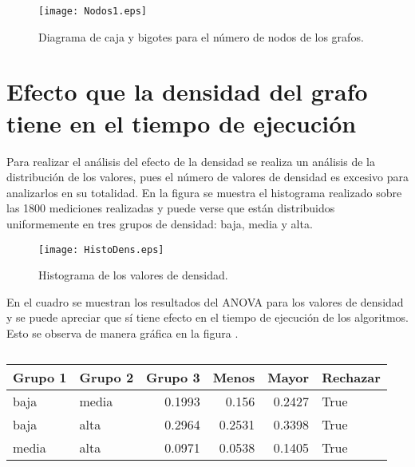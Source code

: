 \documentclass{article}
\begin{document}
\begin{figure}
\begin{center}
  \texttt{[image: Nodos1.eps]}
\end{center}
\vspace*{-8mm}
\caption{Diagrama de caja y bigotes para el número de nodos de los grafos.}
  \label{Figura 4} 
\end{figure}

\section*{Efecto que la densidad del grafo tiene en el tiempo de ejecución}

Para realizar el análisis del efecto de la densidad se realiza un análisis de la distribución de los valores, pues el número de valores de densidad es excesivo para analizarlos en su totalidad. En la figura \pageref{Figura 5} se muestra el histograma realizado sobre las 1800 mediciones realizadas y puede verse que están distribuidos uniformemente en tres grupos de densidad: baja, media y alta.

\begin{figure}
\begin{center}
  \texttt{[image: HistoDens.eps]}
\end{center}
\vspace*{-8mm}
\caption{Histograma de los valores de densidad.}
  \label{Figura 5} 
\end{figure}

En el cuadro \pageref{Cuadro 4} se muestran los resultados del ANOVA para los valores de densidad y se puede apreciar que sí tiene efecto en el tiempo de ejecución de los algoritmos. Esto se observa de manera gráfica en la figura \pageref{Figura 6}.

\begin{table}[htbp]
  \centering
  \caption{}
    \begin{tabular}{|l|l|r|r|r|l|}
    \toprule
    \rowcolor[rgb]{ .357,  .608,  .835} \textbf{Grupo 1} & \textbf{Grupo 2} & \multicolumn{1}{l|}{\textbf{Grupo 3}} & \multicolumn{1}{l|}{\textbf{Menos}} & \multicolumn{1}{l|}{\textbf{Mayor}} & \textbf{Rechazar} \\
    \midrule
    baja  & media & 0.1993 & 0.156 & 0.2427 & True \\
    \midrule
    baja  & alta  & 0.2964 & 0.2531 & 0.3398 & True \\
    \midrule
    media & alta  & 0.0971 & 0.0538 & 0.1405 & True \\
    \bottomrule
    \end{tabular}%
  \label{tab:Cuadro 4}%
\end{table}%
\end{document}

